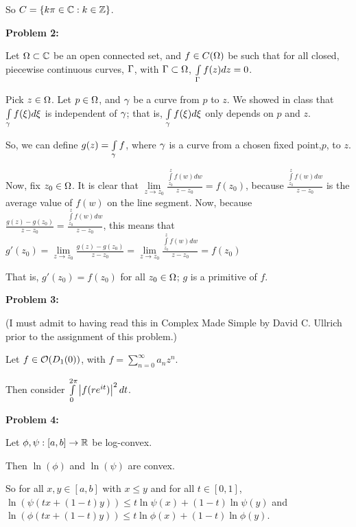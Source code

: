 \documentclass[a4paper,12pt]{article}
\begin{document}
So $C = \{k\pi  \in \mathbb{C}: k \in \mathbb{Z}\}$.

\shunt

{\bf Problem 2:}

Let $\Omega \subset \mathbb{C}$ be an open connected set, and $f \in C(\Omega)$ be such that for all closed, piecewise continuous curves, $\Gamma$, with $\Gamma \subset \Omega$, $\int\limits_\Gamma f(z) dz = 0$.

Pick $z \in \Omega$. Let $p \in \Omega$, and $\gamma$ be a curve from $p$ to $z$. We showed in class that $\int\limits_\gamma f(\xi) d\xi$ is independent of $\gamma$; that is, $\int\limits_\gamma f(\xi) d\xi$ only depends on $p$ and $z$.

So, we can define $g(z) = \int\limits_\gamma f$, where $\gamma$ is a curve from a chosen fixed point,$p$, to $z$.

Now, fix $z_0 \in \Omega$. It is clear that $\lim\limits_{z\to z_0} \frac{\int\limits_{z_0}^z f(w) dw}{z-z_0} = f(z_0)$, because $ \frac{\int\limits_{z_0}^z f(w) dw}{z-z_0}$ is the average value of $f(w)$ on the line segment. Now, because $\frac{g(z)-g(z_0)}{z-z_0} = \frac{\int\limits_{z_0}^z f(w) dw}{z-z_0}$, this means that $g'(z_0) = \lim\limits_{z\to z_0}\frac{g(z)-g(z_0)}{z-z_0} = \lim\limits_{z\to z_0}\frac{\int\limits_{z_0}^z f(w) dw}{z-z_0} = f(z_0)$

That is, $g'(z_0) = f(z_0)$ for all $z_0 \in \Omega$; $g$ is a primitive of $f$.



\shunt

{\bf Problem 3:}

(I must admit to having read this in Complex Made Simple by David C. Ullrich prior to the assignment of this problem.)

Let $f \in \mathcal{O}(D_1(0))$, with $f = \sum\limits_{n=0}^\infty a_nz^n$.

Then consider $\int\limits_0^{2\pi} \left\lvert f(re^{it}) \right\rvert^2 dt$. %

\shunt

{\bf Problem 4:}

Let $\phi, \psi : [a,b] \to \mathbb{R}$ be log-convex.

Then $\ln(\phi)$ and $\ln(\psi)$ are convex.

So for all $x,y \in [a,b]$ with $x \leq y$ and for all $t \in [0,1]$, $\ln(\psi(tx+(1-t)y)) \leq t\ln\psi(x) + (1-t)\ln\psi(y)$ and $\ln(\phi(tx+(1-t)y)) \leq t\ln\phi(x) + (1-t)\ln\phi(y)$.
\end{document}
